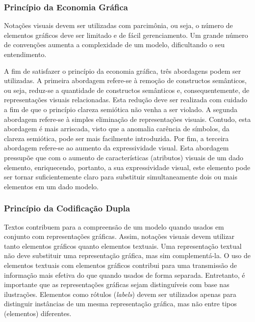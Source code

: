 \subsubsection{Princípio da Economia Gráfica}\label{2-fundamentacao-notacao-visual-principio-economia-grafica}

Notações visuais devem ser utilizadas com parcimônia, ou seja, o número de elementos gráficos deve ser limitado e de fácil gerenciamento. Um grande número de convenções aumenta a complexidade de um modelo, dificultando o seu entendimento.

A fim de satisfazer o princípio da economia gráfica, três abordagens podem ser utilizadas. A primeira abordagem refere-se à remoção de constructos semânticos, ou seja, reduz-se a quantidade de constructos semânticos e, consequentemente, de representações visuais relacionadas. Esta redução deve ser realizada com cuidado a fim de que o princípio clareza semiótica não venha a ser violado. A segunda abordagem refere-se à simples eliminação de representações visuais. Contudo, esta abordagem é mais arriscada, visto que a anomalia carência de símbolos, da clareza semiótica, pode ser mais facilmente introduzida. Por fim, a terceira abordagem refere-se ao aumento da expressividade visual. Esta abordagem pressupõe que com o aumento de características (atributos) visuais de um dado elemento, enriquecendo, portanto, a sua expressividade visual, este elemento pode ser tornar suficientemente claro para substituir simultaneamente dois ou mais elementos em um dado modelo.

\subsubsection{Princípio da Codificação Dupla}\label{2-fundamentacao-notacao-visual-principio-codificacao-dupla}

Textos contribuem para a compreensão de um modelo quando usados em conjunto com representações gráficas. Assim, notações visuais devem utilizar tanto elementos gráficos quanto elementos textuais. Uma representação textual não deve substituir uma representação gráfica, mas sim complementá-la. O uso de elementos textuais com elementos gráficos contribui para uma transmissão de informação mais efetiva do que quando usados de forma separada. Entretanto, é importante que as representações gráficas sejam distinguíveis com base nas ilustrações. Elementos como rótulos (\textit{labels}) devem ser utilizados apenas para distinguir instâncias de um mesma representação gráfica, mas não entre tipos (elementos) diferentes.


